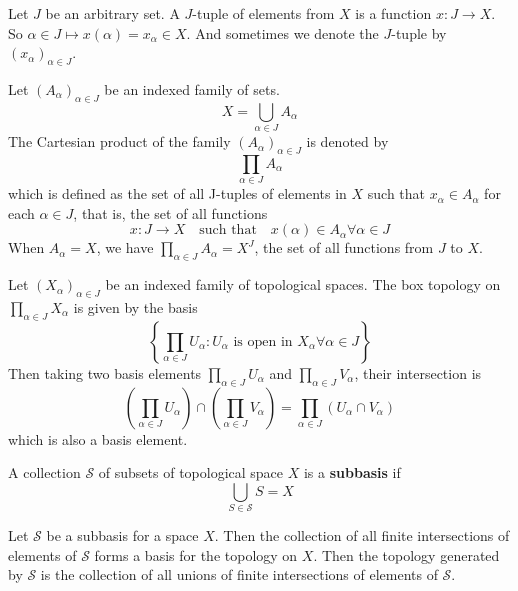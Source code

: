 \documentclass[main.tex]{subfiles}
\begin{document}
\begin{definition}
    Let $J$ be an arbitrary set. A $J$-tuple of elements from $X$ is a function $x:J \rightarrow X$. So $\alpha \in J \mapsto x(\alpha) = x_\alpha \in X$. And sometimes we denote the $J$-tuple by $(x_\alpha)_{\alpha \in J}$. 
\end{definition}

\begin{definition}
    Let $(A_{\alpha})_{\alpha \in J}$ be an indexed family of sets. 
    \begin{equation}
        X = \bigcup_{\alpha \in J} A_{\alpha}
    \end{equation} 
    The Cartesian product of the family $(A_{\alpha})_{\alpha \in J}$ is denoted by 
    \begin{equation}
        \prod_{\alpha \in J} A_{\alpha}
    \end{equation}
    which is defined as the set of all J-tuples of elements in $X$ such that $x_{\alpha} \in A_{\alpha}$ for each $\alpha \in J$, that is, the set of all functions 
    \begin{equation}
        x: J \rightarrow X \quad \text{such that} \quad x(\alpha) \in A_{\alpha} \forall \alpha \in J
    \end{equation}
    When $A_{\alpha} = X$, we have $\prod_{\alpha \in J} A_{\alpha} = X^J$, the set of all functions from $J$ to $X$. 
\end{definition}
\begin{definition}
    Let $(X_{\alpha})_{\alpha \in J}$ be an indexed family of topological spaces. The box topology on $\prod_{\alpha \in J} X_{\alpha}$ is given by the basis 
    \begin{equation}
        \left\{ \prod_{\alpha \in J} U_{\alpha} : U_{\alpha} \text{ is open in } X_{\alpha} \forall \alpha \in J \right\}
    \end{equation}
    Then taking two basis elements $\prod_{\alpha \in J} U_{\alpha}$ and $\prod_{\alpha \in J} V_{\alpha}$, their intersection is 
    \begin{equation}
        \left( \prod_{\alpha \in J} U_{\alpha} \right) \cap \left( \prod_{\alpha \in J} V_{\alpha} \right) = \prod_{\alpha \in J} (U_{\alpha} \cap V_{\alpha})
    \end{equation}
    which is also a basis element. 
\end{definition}
\begin{definition}
    A collection $\mathcal{S}$ of subsets of topological space $X$ is a \textbf{subbasis} if 
    \begin{equation}
        \bigcup_{S \in \mathcal{S}} S = X
    \end{equation}
\end{definition}
\begin{property}
    Let $\mathcal{S}$ be a subbasis for a space $X$. Then the collection of all finite intersections of elements of $\mathcal{S}$ forms a basis for the topology on $X$. Then the topology generated by $\mathcal{S}$ is the collection of all unions of finite intersections of elements of $\mathcal{S}$. 
\end{property}
\end{document}
